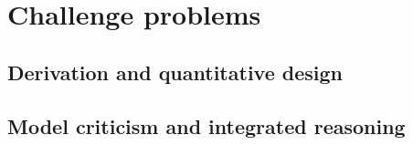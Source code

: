 \section{Challenge problems}
\label{sec:22:challenge-problems}
\subsection{Derivation and quantitative design}
\subsection{Model criticism and integrated reasoning}
